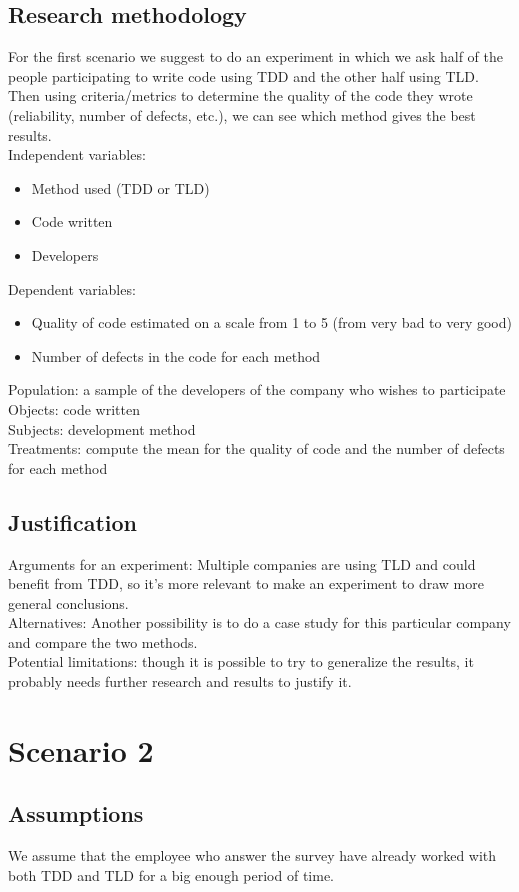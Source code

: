 \documentclass{article}
\begin{document}
\subsection{Research methodology}
For the first scenario we suggest to do an experiment in which we ask half of the people participating to write code using TDD and the other half using TLD. Then using criteria/metrics to determine the quality of the code they wrote (reliability, number of defects, etc.), we can see which method gives the best results.\\
Independent variables:
\begin{itemize}
    \item Method used (TDD or TLD)
    \item Code written
    \item Developers
\end{itemize}
Dependent variables:
\begin{itemize}
    \item Quality of code estimated on a scale from 1 to 5 (from very bad to very good)
    \item Number of defects in the code for each method
\end{itemize}
Population: a sample of the developers of the company who wishes to participate \\
Objects: code written \\
Subjects: development method \\
Treatments: compute the mean for the quality of code and the number of defects for each method

\subsection{Justification}
Arguments for an experiment: Multiple companies are using TLD and could benefit from TDD, so it's more relevant to make an experiment to draw more general conclusions. \\
Alternatives: Another possibility is to do a case study for this particular company and compare the two methods. \\
Potential limitations: though it is possible to try to generalize the results, it probably needs further research and results to justify it.

\section{Scenario 2}
\subsection{Assumptions}
We assume that the employee who answer the survey have already worked with both TDD and TLD for a big enough period of time.
\end{document}
